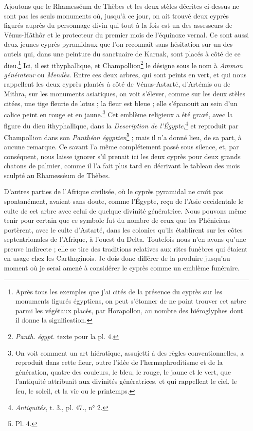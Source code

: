 \documentclass{article}
\begin{document}
Ajoutons que le Rhamesséum de Thèbes et les deux stèles décrites ci-dessus ne sont pas les seuls monuments où, jusqu'à ce jour, on ait trouvé deux cyprès figurés auprès du personnage divin qui tout à la fois est un des assesseurs de Vénus-Hâthôr et le protecteur du premier mois de l'équinoxe vernal. Ce sont aussi deux jeunes cyprès pyramidaux que l'on reconnaît sans hésitation sur un des autels qui, dans une peinture du sanctuaire de Karnak, sont placés à côté de ce dieu.\footnote{Après tous les exemples que j'ai cités de la présence du cyprès sur les monuments figurés égyptiens, on peut s'étonner de ne point trouver cet arbre parmi les végétaux placés, par Horapollon, au nombre des hiéroglyphes dont il donne la signification.} Ici, il est ithyphallique, et Champollion\footnote{\emph{Panth. égypt.} texte pour la pl. 4.} le désigne sous le nom à \emph{Ammon générateur} ou \emph{Mendès}. Entre ces deux arbres, qui sont peints en vert, et qui nous rappellent les deux cyprès plantés à côté de Vénus-Astarté, d'Artémis ou de Mithra, sur les monuments asiatiques, on voit s'élever, comme sur les deux stèles citées, une tige fleurie de lotus ; la fleur est bleue ; elle s'épanouit au sein d'un calice peint en rouge et en jaune.\footnote{On voit comment un art hiératique, assujetti à des règles conventionnelles, a reproduit dans cette fleur, outre l'idée de l'hermaphroditisme et de la génération, quatre des couleurs, le bleu, le rouge, le jaune et le vert, que l'antiquité attribuait aux divinités génératrices, et qui rappellent le ciel, le feu, le soleil, et la vie ou le printemps.} Cet emblème religieux a été gravé, avec la figure du dieu ithyphallique, dans la \emph{Description de l'Égypte},\footnote{\emph{Antiquités}, t. 3., pl. 47., n° 2.} et reproduit par Champollion dans son \emph{Panthéon égyptien}\footnote{Pl. 4.} ; mais il n'a donné lieu, de sa part, à aucune remarque. Ce savant l'a même complétement passé sous silence, et, par conséquent, nous laisse ignorer s'il prenait ici les deux cyprès pour deux grands chatons de palmier, comme il l'a fait plus tard en décrivant le tableau des mois sculpté au Rhamesséum de Thèbes.

D'autres parties de l'Afrique civilisée, où le cyprès pyramidal ne croît pas spontanément, avaient sans doute, comme l'Égypte, reçu de l'Asie occidentale le culte de cet arbre avec celui de quelque divinité génératrice. Nous pouvons même tenir pour certain que ce symbole fut du nombre de ceux que les Phéniciens portèrent, avec le culte d'Astarté, dans les colonies qu'ils établirent sur les côtes septentrionales de l'Afrique, à l'ouest du Delta. Toutefois nous n'en avons qu'une preuve indirecte ; elle se tire des traditions relatives aux rites funèbres qui étaient en usage chez les Carthaginois. Je dois donc différer de la produire jusqu'au moment où je serai amené à considérer le cyprès comme un emblème funéraire.
\end{document}
